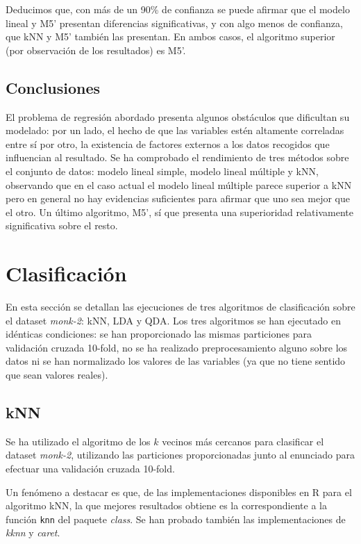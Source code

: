 \documentclass[a4paper, 11pt]{article}
\begin{document}
Deducimos que, con más de un 90\% de confianza se puede afirmar que el modelo lineal y M5' presentan diferencias significativas, y con algo menos de confianza, que kNN y M5' también las presentan. En ambos casos, el algoritmo superior (por observación de los resultados) es M5'.

\subsection{Conclusiones}

El problema de regresión abordado presenta algunos obstáculos que dificultan su modelado: por un lado, el hecho de que las variables estén altamente correladas entre sí\; por otro, la existencia de factores externos a los datos recogidos que influencian al resultado. Se ha comprobado el rendimiento de tres métodos sobre el conjunto de datos: modelo lineal simple, modelo lineal múltiple y kNN, observando que en el caso actual el modelo lineal múltiple parece superior a kNN pero en general no hay evidencias suficientes para afirmar que uno sea mejor que el otro. Un último algoritmo, M5', sí que presenta una superioridad relativamente significativa sobre el resto.

\section{Clasificación}

En esta sección se detallan las ejecuciones de tres algoritmos de clasificación sobre el dataset \textit{monk-2}: kNN, LDA y QDA. Los tres algoritmos se han ejecutado en idénticas condiciones: se han proporcionado las mismas particiones para validación cruzada 10-fold, no se ha realizado preprocesamiento alguno sobre los datos ni se han normalizado los valores de las variables (ya que no tiene sentido que sean valores reales).

\subsection{kNN}

Se ha utilizado el algoritmo de los $k$ vecinos más cercanos para clasificar el dataset \textit{monk-2}, utilizando las particiones proporcionadas junto al enunciado para efectuar una validación cruzada 10-fold.

Un fenómeno a destacar es que, de las implementaciones disponibles en R para el algoritmo kNN, la que mejores resultados obtiene es la correspondiente a la función \texttt{knn} del paquete \textit{class}. Se han probado también las implementaciones de \textit{kknn} y \textit{caret}.
\end{document}

